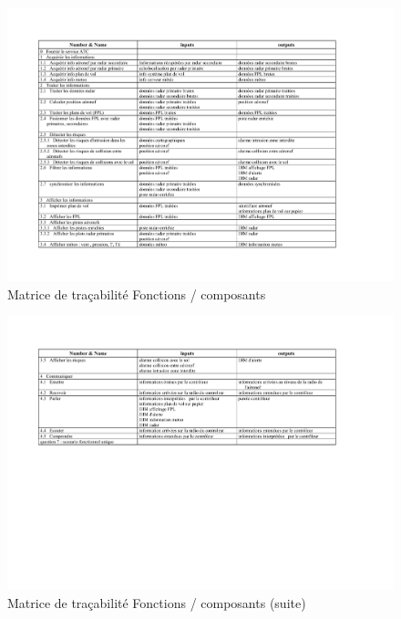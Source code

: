 \begin{landscape}

\begin{figure}[H]
	\begin{center}	
		\includegraphics[scale=0.7]{images/tfio}
		
		\caption{Matrice de traçabilité Fonctions / composants }
		\label{tfio}
	\end{center}
\end{figure}
	



	\begin{figure}[H]
		\begin{center}	
			\includegraphics[scale=0.7]{images/tfio2}
			\caption{Matrice de traçabilité Fonctions / composants (suite)}
			\label{tfio2}
		\end{center}
	\end{figure}
	
\end{landscape}